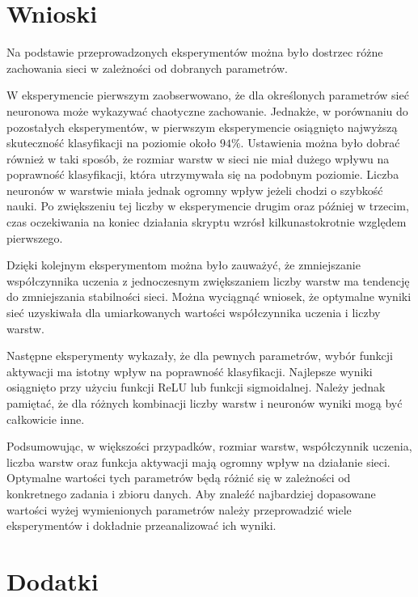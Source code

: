\documentclass[a4paper]{article}
\begin{document}
\newpage
\section{Wnioski}
Na podstawie przeprowadzonych eksperymentów można było dostrzec różne zachowania sieci w zależności od dobranych parametrów.

W eksperymencie pierwszym zaobserwowano, że dla określonych parametrów sieć neuronowa może wykazywać chaotyczne zachowanie.
Jednakże, w porównaniu do pozostałych eksperymentów, w pierwszym eksperymencie osiągnięto najwyższą skuteczność klasyfikacji na poziomie około $94\%$.
Ustawienia można było dobrać również w taki sposób, że rozmiar warstw w sieci nie miał dużego wpływu na poprawność klasyfikacji, która utrzymywała się na podobnym poziomie.
Liczba neuronów w warstwie miała jednak ogromny wpływ jeżeli chodzi o szybkość nauki.
Po zwiększeniu tej liczby w eksperymencie drugim oraz później w trzecim, czas oczekiwania na koniec działania skryptu wzrósł kilkunastokrotnie względem pierwszego.

Dzięki kolejnym eksperymentom można było zauważyć, że zmniejszanie współczynnika uczenia z jednoczesnym zwiększaniem liczby warstw ma tendencję do zmniejszania stabilności sieci.
Można wyciągnąć wniosek, że optymalne wyniki sieć uzyskiwała dla umiarkowanych wartości współczynnika uczenia i liczby warstw.

Następne eksperymenty wykazały, że dla pewnych parametrów, wybór funkcji aktywacji ma istotny wpływ na poprawność klasyfikacji.
Najlepsze wyniki osiągnięto przy użyciu funkcji ReLU lub funkcji sigmoidalnej.
Należy jednak pamiętać, że dla różnych kombinacji liczby warstw i neuronów wyniki mogą być całkowicie inne.

Podsumowując, w większości przypadków, rozmiar warstw, współczynnik uczenia, liczba warstw oraz funkcja aktywacji mają ogromny wpływ na działanie sieci.
Optymalne wartości tych parametrów będą różnić się w zależności od konkretnego zadania i zbioru danych.
Aby znaleźć najbardziej dopasowane wartości wyżej wymienionych parametrów należy przeprowadzić wiele eksperymentów i dokładnie przeanalizować ich wyniki.

\newpage
\section{Dodatki}
\end{document}
